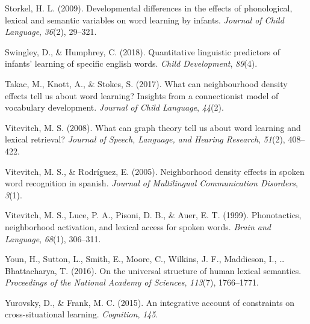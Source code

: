 \documentclass[english,floatsintext,man]{apa6}
\theoremstyle{definition}
\theoremstyle{definition}
\theoremstyle{definition}
\theoremstyle{remark}
\begin{document}
\hypertarget{ref-storkel2009}{}
Storkel, H. L. (2009). Developmental differences in the effects of
phonological, lexical and semantic variables on word learning by
infants. \emph{Journal of Child Language}, \emph{36}(2), 29--321.

\hypertarget{ref-swingley2018}{}
Swingley, D., \& Humphrey, C. (2018). Quantitative linguistic predictors
of infants' learning of specific english words. \emph{Child
Development}, \emph{89}(4).

\hypertarget{ref-takac2017}{}
Takac, M., Knott, A., \& Stokes, S. (2017). What can neighbourhood
density effects tell us about word learning? Insights from a
connectionist model of vocabulary development. \emph{Journal of Child
Language}, \emph{44}(2).

\hypertarget{ref-vitevitch2008}{}
Vitevitch, M. S. (2008). What can graph theory tell us about word
learning and lexical retrieval? \emph{Journal of Speech, Language, and
Hearing Research}, \emph{51}(2), 408--422.

\hypertarget{ref-vitevitch2005}{}
Vitevitch, M. S., \& Rodríguez, E. (2005). Neighborhood density effects
in spoken word recognition in spanish. \emph{Journal of Multilingual
Communication Disorders}, \emph{3}(1).

\hypertarget{ref-vitevitch1999}{}
Vitevitch, M. S., Luce, P. A., Pisoni, D. B., \& Auer, E. T. (1999).
Phonotactics, neighborhood activation, and lexical access for spoken
words. \emph{Brain and Language}, \emph{68}(1), 306--311.

\hypertarget{ref-youn2016}{}
Youn, H., Sutton, L., Smith, E., Moore, C., Wilkins, J. F., Maddieson,
I., \ldots{} Bhattacharya, T. (2016). On the universal structure of
human lexical semantics. \emph{Proceedings of the National Academy of
Sciences}, \emph{113}(7), 1766--1771.

\hypertarget{ref-yurovsky2015}{}
Yurovsky, D., \& Frank, M. C. (2015). An integrative account of
constraints on cross-situational learning. \emph{Cognition}, \emph{145}.
\end{document}
